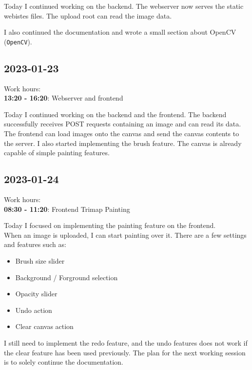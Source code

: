 \documentclass{article}
\begin{document}
Today I continued working on the backend. The webserver
now serves the static webistes files. The upload root
can read the image data.

I also continued the documentation and wrote a small section
about OpenCV (\texttt{OpenCV}).

\subsection{2023-01-23}

Work hours:\\
\textbf{13:20 - 16:20}: Webserver and frontend

Today I continued working on the backend and the frontend.
The backend successfully receives POST requests containing an image
and can read its data. The frontend can load images onto the canvas
and send the canvas contents to the server. I also started
implementing the brush feature. The canvas is already capable
of simple painting features.

\subsection{2023-01-24}

Work hours:\\
\textbf{08:30 - 11:20}: Frontend Trimap Painting

Today I focused on implementing the painting feature on the frontend. \\
When an image is uploaded, I can start painting over it. There are a few settings and features such as:
\begin{itemize}
    \item Brush size slider
    \item Background / Forground selection
    \item Opacity slider
    \item Undo action
    \item Clear canvas action
\end{itemize}

I still need to implement the redo feature, and the undo features does not work if the clear feature has been
used previously. The plan for the next working session is to solely continue the documentation.
\end{document}
